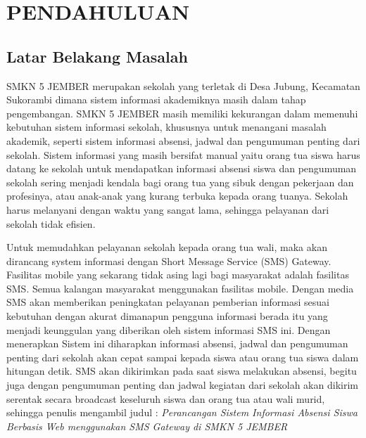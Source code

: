 \documentclass{jtetiproposalskripsi}
\begin{document}
\chapter{PENDAHULUAN}

\section{Latar Belakang Masalah}
SMKN 5 JEMBER merupakan sekolah yang terletak di Desa Jubung, Kecamatan Sukorambi dimana sistem informasi akademiknya masih dalam tahap pengembangan. SMKN 5 JEMBER masih memiliki kekurangan dalam memenuhi kebutuhan sistem informasi sekolah, khususnya untuk menangani masalah akademik, seperti sistem informasi absensi, jadwal dan pengumuman penting dari sekolah. Sistem informasi yang masih bersifat manual yaitu orang tua siswa harus datang ke sekolah untuk mendapatkan informasi absensi siswa dan pengumuman sekolah sering menjadi kendala bagi orang tua yang sibuk dengan pekerjaan dan profesinya, atau anak-anak yang kurang terbuka kepada orang tuanya. Sekolah harus melanyani dengan waktu yang sangat lama, sehingga pelayanan dari sekolah tidak efisien.

Untuk memudahkan pelayanan sekolah kepada orang tua wali, maka akan dirancang system informasi dengan Short Message Service (SMS) Gateway. Fasilitas mobile yang sekarang tidak asing lagi bagi masyarakat adalah fasilitas SMS. Semua kalangan masyarakat menggunakan fasilitas mobile. Dengan media SMS akan memberikan peningkatan pelayanan pemberian informasi sesuai kebutuhan dengan akurat dimanapun pengguna informasi berada itu yang menjadi keunggulan yang diberikan oleh sistem informasi SMS ini. Dengan menerapkan Sistem ini diharapkan informasi absensi, jadwal dan pengumuman penting dari sekolah akan cepat sampai kepada siswa atau orang tua siswa dalam hitungan detik. SMS akan dikirimkan pada saat siswa melakukan absensi, begitu juga dengan pengumuman penting dan jadwal kegiatan dari sekolah akan dikirim serentak secara broadcast keseluruh siswa dan orang tua atau wali murid, sehingga penulis mengambil judul : \textit{Perancangan Sistem Informasi Absensi Siswa Berbasis Web menggunakan SMS Gateway di SMKN 5 JEMBER}
\end{document}
